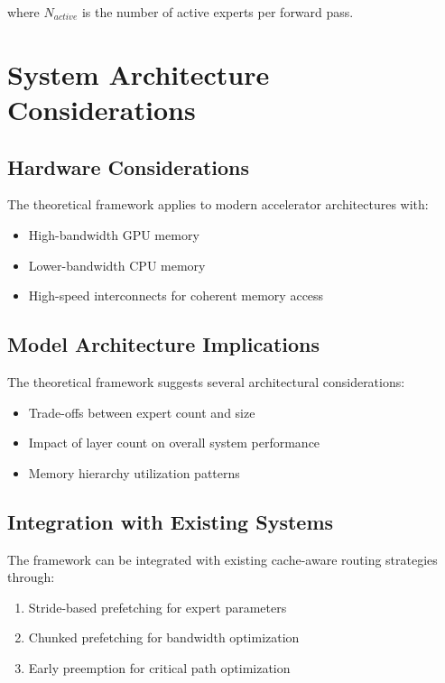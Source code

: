 \documentclass[11pt]{article}
\begin{document}
where $N_{active}$ is the number of active experts per forward pass.

\section{System Architecture Considerations}

\subsection{Hardware Considerations}

The theoretical framework applies to modern accelerator architectures with:
\begin{itemize}
    \item High-bandwidth GPU memory
    \item Lower-bandwidth CPU memory
    \item High-speed interconnects for coherent memory access
\end{itemize}

\subsection{Model Architecture Implications}

The theoretical framework suggests several architectural considerations:
\begin{itemize}
    \item Trade-offs between expert count and size
    \item Impact of layer count on overall system performance
    \item Memory hierarchy utilization patterns
\end{itemize}

\subsection{Integration with Existing Systems}

The framework can be integrated with existing cache-aware routing strategies through:
\begin{enumerate}
    \item Stride-based prefetching for expert parameters
    \item Chunked prefetching for bandwidth optimization
    \item Early preemption for critical path optimization
\end{enumerate}
\end{document}
